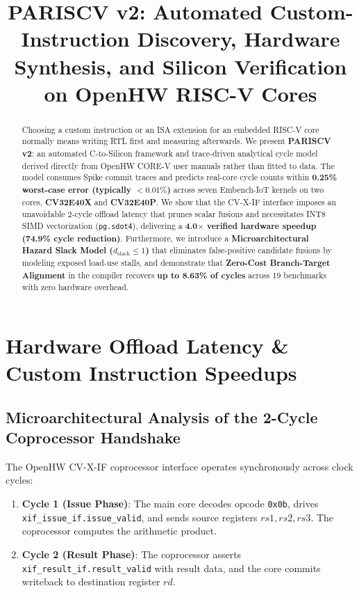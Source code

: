 \documentclass[11pt,a4paper]{article}
\title{\textbf{\LARGE PARISCV v2: Automated Custom-Instruction Discovery, Hardware Synthesis, and Silicon Verification on OpenHW RISC-V Cores}}
\author{}
\date{}
\begin{document}
\maketitle

\begin{abstract}
Choosing a custom instruction or an ISA extension for an embedded RISC-V core normally means writing RTL first and measuring afterwards. We present \textbf{PARISCV v2}: an automated C-to-Silicon framework and trace-driven analytical cycle model derived directly from OpenHW CORE-V user manuals rather than fitted to data. The model consumes Spike commit traces and predicts real-core cycle counts within \textbf{0.25\% worst-case error (typically $<0.01\%$)} across seven Embench-IoT kernels on two cores, \textbf{CV32E40X} and \textbf{CV32E40P}. We show that the CV-X-IF interface imposes an unavoidable 2-cycle offload latency that prunes scalar fusions and necessitates INT8 SIMD vectorization (\texttt{pg.sdot4}), delivering a \textbf{4.0$\times$ verified hardware speedup (74.9\% cycle reduction)}. Furthermore, we introduce a \textbf{Microarchitectural Hazard Slack Model ($d_{\text{slack}} \le 1$)} that eliminates false-positive candidate fusions by modeling exposed load-use stalls, and demonstrate that \textbf{Zero-Cost Branch-Target Alignment} in the compiler recovers \textbf{up to 8.63\% of cycles} across 19 benchmarks with zero hardware overhead.
\end{abstract}

\section{Hardware Offload Latency \& Custom Instruction Speedups}

\subsection{Microarchitectural Analysis of the 2-Cycle Coprocessor Handshake}
The OpenHW CV-X-IF coprocessor interface operates synchronously across clock cycles:
\begin{enumerate}
    \item \textbf{Cycle 1 (Issue Phase)}: The main core decodes opcode \texttt{0x0b}, drives \texttt{xif\_issue\_if.issue\_valid}, and sends source registers $rs1, rs2, rs3$. The coprocessor computes the arithmetic product.
    \item \textbf{Cycle 2 (Result Phase)}: The coprocessor asserts \texttt{xif\_result\_if.result\_valid} with result data, and the core commits writeback to destination register $rd$.
\end{enumerate}
\end{document}
